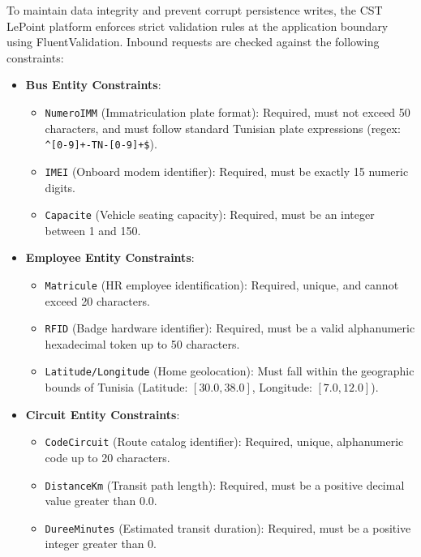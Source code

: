 To maintain data integrity and prevent corrupt persistence writes, the CST LePoint platform enforces strict validation rules at the application boundary using FluentValidation. Inbound requests are checked against the following constraints:

\begin{itemize}
  \item \textbf{Bus Entity Constraints}:
  \begin{itemize}
    \item \texttt{NumeroIMM} (Immatriculation plate format): Required, must not exceed 50 characters, and must follow standard Tunisian plate expressions (regex: \verb|^[0-9]+-TN-[0-9]+$|).
    \item \texttt{IMEI} (Onboard modem identifier): Required, must be exactly 15 numeric digits.
    \item \texttt{Capacite} (Vehicle seating capacity): Required, must be an integer between 1 and 150.
  \end{itemize}

  \item \textbf{Employee Entity Constraints}:
  \begin{itemize}
    \item \texttt{Matricule} (HR employee identification): Required, unique, and cannot exceed 20 characters.
    \item \texttt{RFID} (Badge hardware identifier): Required, must be a valid alphanumeric hexadecimal token up to 50 characters.
    \item \texttt{Latitude/Longitude} (Home geolocation): Must fall within the geographic bounds of Tunisia (Latitude: $[30.0, 38.0]$, Longitude: $[7.0, 12.0]$).
  \end{itemize}

  \item \textbf{Circuit Entity Constraints}:
  \begin{itemize}
    \item \texttt{CodeCircuit} (Route catalog identifier): Required, unique, alphanumeric code up to 20 characters.
    \item \texttt{DistanceKm} (Transit path length): Required, must be a positive decimal value greater than 0.0.
    \item \texttt{DureeMinutes} (Estimated transit duration): Required, must be a positive integer greater than 0.
  \end{itemize}
\end{itemize}

